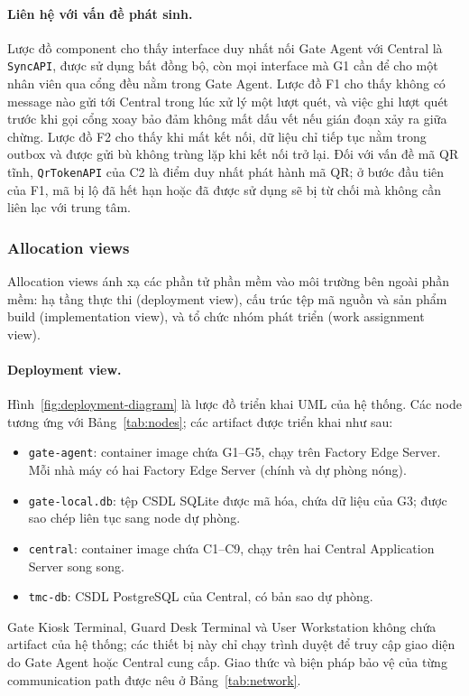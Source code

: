 \paragraph{Liên hệ với vấn đề phát sinh.} Lược đồ component cho thấy interface duy nhất nối Gate Agent với Central là \texttt{SyncAPI}, được sử dụng bất đồng bộ, còn mọi interface mà G1 cần để cho một nhân viên qua cổng đều nằm trong Gate Agent. Lược đồ F1 cho thấy không có message nào gửi tới Central trong lúc xử lý một lượt quét, và việc ghi lượt quét trước khi gọi cổng xoay bảo đảm không mất dấu vết nếu gián đoạn xảy ra giữa chừng. Lược đồ F2 cho thấy khi mất kết nối, dữ liệu chỉ tiếp tục nằm trong outbox và được gửi bù không trùng lặp khi kết nối trở lại. Đối với vấn đề mã QR tĩnh, \texttt{QrTokenAPI} của C2 là điểm duy nhất phát hành mã QR; ở bước đầu tiên của F1, mã bị lộ đã hết hạn hoặc đã được sử dụng sẽ bị từ chối mà không cần liên lạc với trung tâm.

\subsubsection{Allocation views}\label{sec:allocation-views}
Allocation views ánh xạ các phần tử phần mềm vào môi trường bên ngoài phần mềm: hạ tầng thực thi (deployment view), cấu trúc tệp mã nguồn và sản phẩm build (implementation view), và tổ chức nhóm phát triển (work assignment view).

\paragraph{Deployment view.} Hình~\ref{fig:deployment-diagram} là lược đồ triển khai UML của hệ thống. Các node tương ứng với Bảng~\ref{tab:nodes}; các artifact được triển khai như sau:
\begin{itemize}
    \item \texttt{gate-agent}: container image chứa G1--G5, chạy trên Factory Edge Server. Mỗi nhà máy có hai Factory Edge Server (chính và dự phòng nóng).
    \item \texttt{gate-local.db}: tệp CSDL SQLite được mã hóa, chứa dữ liệu của G3; được sao chép liên tục sang node dự phòng.
    \item \texttt{central}: container image chứa C1--C9, chạy trên hai Central Application Server song song.
    \item \texttt{tmc-db}: CSDL PostgreSQL của Central, có bản sao dự phòng.
\end{itemize}
Gate Kiosk Terminal, Guard Desk Terminal và User Workstation không chứa artifact của hệ thống; các thiết bị này chỉ chạy trình duyệt để truy cập giao diện do Gate Agent hoặc Central cung cấp. Giao thức và biện pháp bảo vệ của từng communication path được nêu ở Bảng~\ref{tab:network}.


